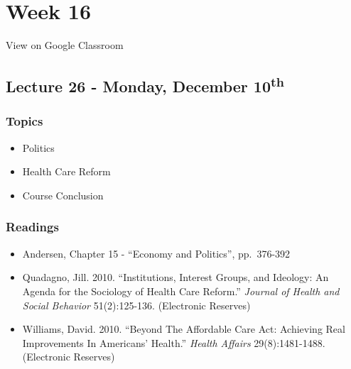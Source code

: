 \documentclass[]{book}
\providecommand{\tightlist}{%
  \setlength{\itemsep}{0pt}\setlength{\parskip}{0pt}}
\theoremstyle{definition}
\theoremstyle{definition}
\theoremstyle{definition}
\theoremstyle{remark}
\begin{document}
\hypertarget{week-16}{%
\section*{Week 16}\label{week-16}}

View on Google Classroom

\hypertarget{lecture-26---monday-december-10th}{%
\subsection*{\texorpdfstring{Lecture 26 - Monday, December
10\textsuperscript{th}}{Lecture 26 - Monday, December 10th}}\label{lecture-26---monday-december-10th}}

\hypertarget{topics-30}{%
\subsubsection*{Topics}\label{topics-30}}

\begin{itemize}
\tightlist
\item
  Politics
\item
  Health Care Reform
\item
  Course Conclusion
\end{itemize}

\hypertarget{readings-28}{%
\subsubsection*{Readings}\label{readings-28}}

\begin{itemize}
\tightlist
\item
  Andersen, Chapter 15 - ``Economy and Politics'', pp.~376-392
\item
  Quadagno, Jill. 2010. ``Institutions, Interest Groups, and Ideology:
  An Agenda for the Sociology of Health Care Reform.'' \emph{Journal of
  Health and Social Behavior} 51(2):125-136. (Electronic Reserves)
\item
  Williams, David. 2010. ``Beyond The Affordable Care Act: Achieving
  Real Improvements In Americans' Health.'' \emph{Health Affairs}
  29(8):1481-1488. (Electronic Reserves)
\end{itemize}
\end{document}
